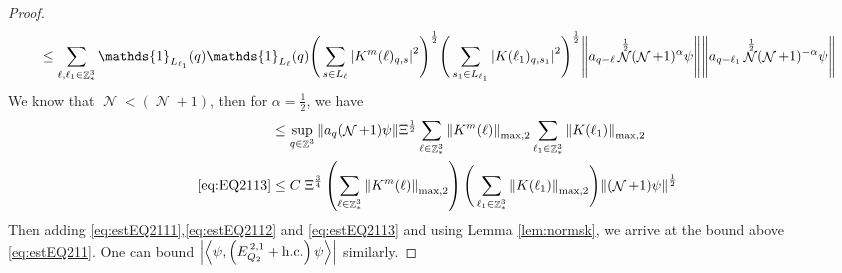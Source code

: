 \documentclass[sn-mathphys, Numbered ,a4paper]{sn-jnl}%
\DeclareMathOperator{\Z}{\mathbb{Z}}
\DeclareMathOperator{\NN}{\mathcal{N}}
\newcommand{\half}{\frac{1}{2}}
\newcommand{\eva}[1]{\left\langle #1 \right\rangle}
\theoremstyle{plain}
\theoremstyle{definition}
\theoremstyle{remark}
\theoremstyle{plain}
\theoremstyle{definition}
\theoremstyle{remark}
\begin{document}
\begin{proof}
\begin{align}
	&\leq\sum\limits_{\ell, \ell_1\in \Z^3_*} \mathds{1}_{L_{\ell_1}}(q) \mathds{1}_{L_{\ell}}(q) \Bigg(\sum\limits_{s \in L_{\ell}} \abs{K^m(\ell)_{q,s}}^2\Bigg)^\half \Bigg(\sum\limits_{s_1 \in L_{\ell_1}} \abs{K(\ell_1)_{q,s_1}}^2\Bigg)^\half \norm{ a_{q-\ell} \NN^\half (\NN+1)^{\alpha}\psi} \norm{ a_{q-\ell_1} \NN^\half (\NN+1)^{-\alpha} \psi }\nonumber\\
\end{align}
We know that $\NN<(\NN+1)$, then for $\alpha = \half$, we have
\begin{align}
	&\leq \sup_{q \in \Z^3}\norm{ a_{q} (\NN+1)\psi} \Xi^\half\sum\limits_{\ell \in \Z^3_*} \norm{  K^{m}(\ell)}_{\mathrm{max,2}}  \sum\limits_{\ell_1 \in \Z^3_*} \norm{K(\ell_1)}_{\mathrm{max,2}} \nonumber\\
	\eqref{eq:EQ2113}&\leq C\;\Xi^{\frac{3}{4}} \left(\sum\limits_{\ell \in \Z^3_*} \norm{K^m(\ell)}_{\mathrm{max,2}}\right) \Bigg(\sum\limits_{\ell_1 \in \Z^3_*} \norm{K(\ell_1)}_{\mathrm{max,2}} \Bigg)  \norm{ (\NN+1)\psi}^\half \label{eq:estEQ2113}
\end{align}
  Then adding \eqref{eq:estEQ2111},\eqref{eq:estEQ2112} and \eqref{eq:estEQ2113} and using Lemma \ref{lem:normsk}, we arrive at the bound above \eqref{eq:estEQ211}. One can bound $\abs{\eva{\psi,\left(E^{\,2,1}_{Q_2}+\mathrm{h.c.}\right) \psi }}$ similarly.
\end{proof}
\end{document}
